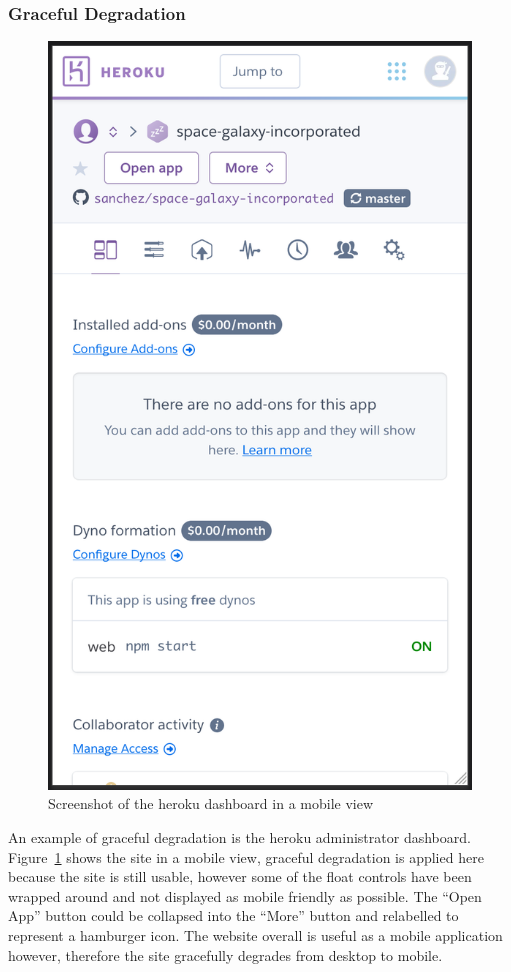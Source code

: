 

\subsubsection{Graceful Degradation}
\begin{figure}
	\centering
	\includegraphics[width=0.3\linewidth]{heroku1}	
	\caption{Screenshot of the \gls{heroku} dashboard in a mobile view}\label{fig:heroku}
\end{figure}

An example of graceful degradation is the \gls{heroku} administrator dashboard. Figure~\ref{fig:heroku} shows the site in a mobile view, graceful degradation is applied here because the site is still usable, however some of the float controls have been wrapped around and not displayed as mobile friendly as possible. The ``Open App'' button could be collapsed into the ``More'' button and relabelled to represent a hamburger icon. The website overall is useful as a mobile application however, therefore the site gracefully degrades from desktop to mobile.

